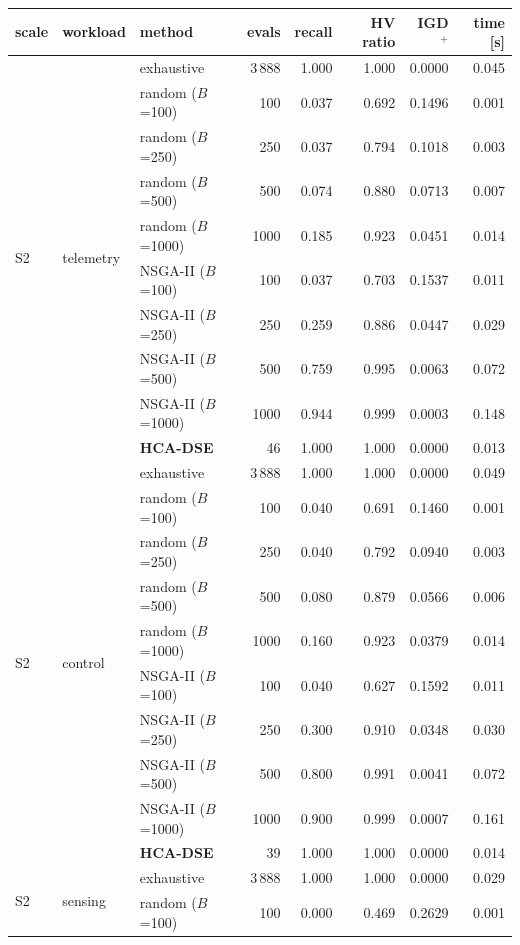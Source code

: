 \scriptsize
\begin{tabular}{lllrrrrr}
\toprule
scale & workload & method & evals & recall & HV ratio & IGD$^{+}$ & time [s] \\
\midrule
\multirow{10}{*}{S2} & \multirow{10}{*}{telemetry} & exhaustive & 3\,888 & 1.000 & 1.000 & 0.0000 & 0.045 \\
 & & random ($B$=100) & 100 & 0.037 & 0.692 & 0.1496 & 0.001 \\
 & & random ($B$=250) & 250 & 0.037 & 0.794 & 0.1018 & 0.003 \\
 & & random ($B$=500) & 500 & 0.074 & 0.880 & 0.0713 & 0.007 \\
 & & random ($B$=1000) & 1000 & 0.185 & 0.923 & 0.0451 & 0.014 \\
 & & NSGA-II ($B$=100) & 100 & 0.037 & 0.703 & 0.1537 & 0.011 \\
 & & NSGA-II ($B$=250) & 250 & 0.259 & 0.886 & 0.0447 & 0.029 \\
 & & NSGA-II ($B$=500) & 500 & 0.759 & 0.995 & 0.0063 & 0.072 \\
 & & NSGA-II ($B$=1000) & 1000 & 0.944 & 0.999 & 0.0003 & 0.148 \\
 & & \textbf{HCA-DSE} & 46 & 1.000 & 1.000 & 0.0000 & 0.013 \\
\midrule
\multirow{10}{*}{S2} & \multirow{10}{*}{control} & exhaustive & 3\,888 & 1.000 & 1.000 & 0.0000 & 0.049 \\
 & & random ($B$=100) & 100 & 0.040 & 0.691 & 0.1460 & 0.001 \\
 & & random ($B$=250) & 250 & 0.040 & 0.792 & 0.0940 & 0.003 \\
 & & random ($B$=500) & 500 & 0.080 & 0.879 & 0.0566 & 0.006 \\
 & & random ($B$=1000) & 1000 & 0.160 & 0.923 & 0.0379 & 0.014 \\
 & & NSGA-II ($B$=100) & 100 & 0.040 & 0.627 & 0.1592 & 0.011 \\
 & & NSGA-II ($B$=250) & 250 & 0.300 & 0.910 & 0.0348 & 0.030 \\
 & & NSGA-II ($B$=500) & 500 & 0.800 & 0.991 & 0.0041 & 0.072 \\
 & & NSGA-II ($B$=1000) & 1000 & 0.900 & 0.999 & 0.0007 & 0.161 \\
 & & \textbf{HCA-DSE} & 39 & 1.000 & 1.000 & 0.0000 & 0.014 \\
\midrule
\multirow{10}{*}{S2} & \multirow{10}{*}{sensing} & exhaustive & 3\,888 & 1.000 & 1.000 & 0.0000 & 0.029 \\
 & & random ($B$=100) & 100 & 0.000 & 0.469 & 0.2629 & 0.001 \\

\end{tabular}
